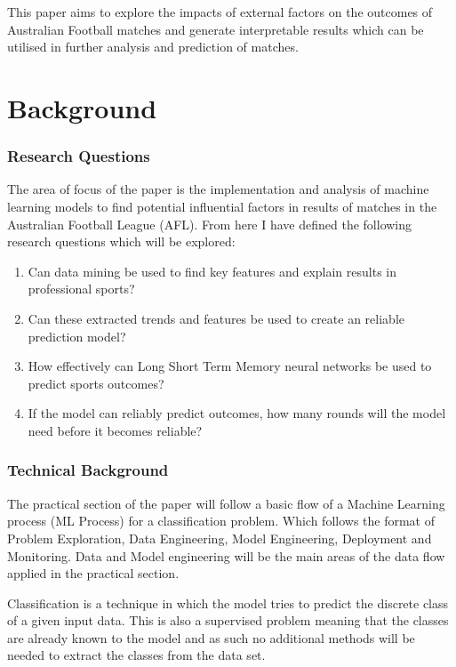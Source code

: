 \documentclass{imc-inf}
\begin{document}
	This paper aims to explore the impacts of external factors on the outcomes of Australian Football matches and generate interpretable results which can be utilised in further analysis and prediction of matches.
	
	
	\chapter{Background}\label{chap:background}
	\subsection{Research Questions}
	
	The area of focus of the paper is the implementation and analysis of machine learning models to find potential influential factors in results of matches in the Australian Football League (AFL).
	From here I have defined the following research questions which will be explored:
	\begin{enumerate}
		
		\item[] Can data mining be used to find key features and explain results in professional sports?
		
		\item[]Can these extracted trends and features be used to create an reliable prediction model?
		
		\item[] How effectively can Long Short Term Memory neural networks be used to predict sports outcomes?
		
		\item[] If the model can reliably predict outcomes, how many rounds will the model need before it becomes reliable?
	\end{enumerate}
	
	
	\subsection{Technical Background}
	The practical section of the paper will follow a basic flow of a Machine Learning process (ML Process) for a classification problem. Which follows the format of Problem Exploration, Data Engineering, Model Engineering, Deployment and Monitoring. Data and Model engineering will be the main areas of the data flow applied in the practical section.
	
	Classification is a technique in which the model tries to predict the discrete class of a given input data. This is also a supervised problem meaning that the classes are already known to the model and as such no additional methods will be needed to extract the classes from the data set.
	\newline
	
\end{document}
